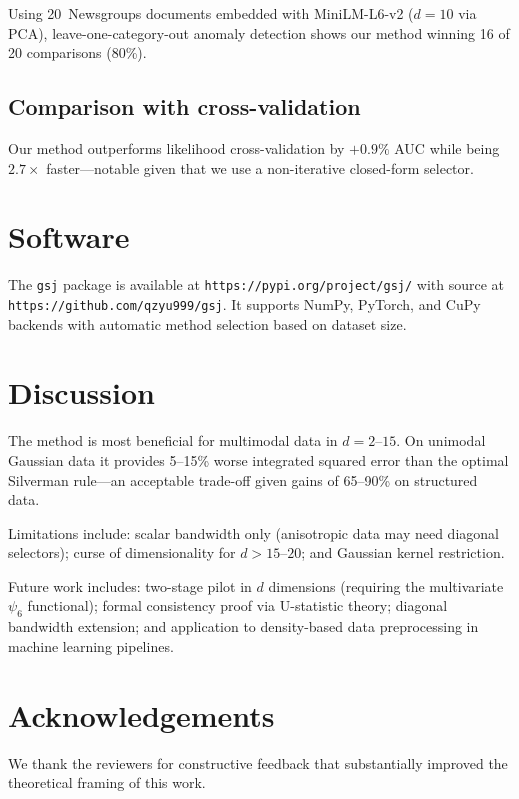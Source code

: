 \documentclass[numsec,webpdf,modern,medium,namedate]{oup-authoring-template}
\theoremstyle{thmstyleone}
\theoremstyle{thmstyletwo}
\theoremstyle{thmstylethree}
\begin{document}
Using 20~Newsgroups documents embedded with MiniLM-L6-v2 ($d=10$ via PCA), leave-one-category-out anomaly detection shows our method winning 16 of 20 comparisons (80\%).

\subsection{Comparison with cross-validation}

Our method outperforms likelihood cross-validation by $+0.9\%$ AUC while being $2.7\times$ faster---notable given that we use a non-iterative closed-form selector.


\section{Software}\label{sec:software}

The \texttt{gsj} package is available at \texttt{https://pypi.org/project/gsj/} with source at \texttt{https://github.com/qzyu999/gsj}. It supports NumPy, PyTorch, and CuPy backends with automatic method selection based on dataset size.


\section{Discussion}\label{sec:discussion}

The method is most beneficial for multimodal data in $d = 2$--$15$. On unimodal Gaussian data it provides 5--15\% worse integrated squared error than the optimal Silverman rule---an acceptable trade-off given gains of 65--90\% on structured data.

Limitations include: scalar bandwidth only (anisotropic data may need diagonal selectors); curse of dimensionality for $d > 15$--$20$; and Gaussian kernel restriction.

Future work includes: two-stage pilot in $d$ dimensions (requiring the multivariate $\psi_6$ functional); formal consistency proof via U-statistic theory; diagonal bandwidth extension; and application to density-based data preprocessing in machine learning pipelines.


\section*{Acknowledgements}

We thank the reviewers for constructive feedback that substantially improved the theoretical framing of this work.
\end{document}
